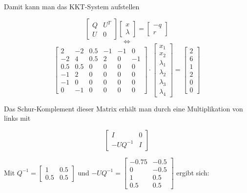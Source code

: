 \documentclass[a4paper, 12pt]{report}
\begin{document}
Damit kann man das KKT-System aufstellen

$$ \begin{bmatrix}Q & U^T\\U & 0\end{bmatrix} \begin{bmatrix}x\\\lambda\end{bmatrix} = \begin{bmatrix}-q\\r\end{bmatrix} $$
$$ \Leftrightarrow $$
$$ \begin{bmatrix}2 & -2 & 0.5 & -1 & -1 & 0\\-2 & 4 & 0.5 & 2 & 0 & -1\\0.5 & 0.5 & 0 & 0 & 0 & 0\\-1 & 2 & 0 & 0 & 0 & 0\\-1 & 0 & 0 & 0 & 0 & 0\\0 & -1 & 0 & 0 & 0 & 0\end{bmatrix} \cdot \begin{bmatrix}x_1\\x_2\\\lambda_1\\\lambda_2\\\lambda_3\\\lambda_4\end{bmatrix} = \begin{bmatrix}2\\6\\1\\2\\0\\0\end{bmatrix} $$

Das Schur-Komplement dieser Matrix erhält man durch eine Multiplikation von links mit

$$ \begin{bmatrix}I & 0\\-UQ^{-1} & I\end{bmatrix} $$

Mit $Q^{-1} = \begin{bmatrix} 1 & 0.5\\ 0.5 & 0.5 \end{bmatrix}$ und $-UQ^{-1} = \begin{bmatrix} -0.75 & -0.5\\0 & -0.5\\1 & 0.5\\0.5 & 0.5 \end{bmatrix}$ ergibt sich:
\end{document}
